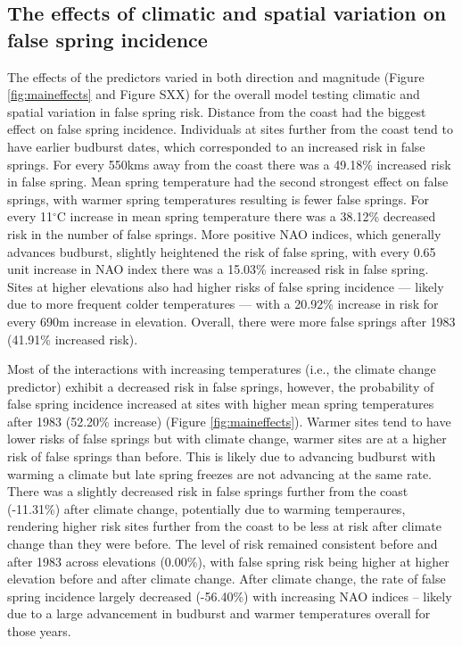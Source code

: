\documentclass{article}\usepackage[]{graphicx}\usepackage[]{color}
\begin{document}
\subsection*{The effects of climatic and spatial variation on false spring incidence}
The effects of the predictors varied in both direction and magnitude (Figure \ref{fig:maineffects} and Figure SXX) for the overall model testing climatic and spatial variation in false spring risk. Distance from the coast had the biggest effect on false spring incidence. Individuals at sites further from the coast tend to have earlier budburst dates, which corresponded to an increased risk in false springs. For every 550kms away from the coast there was a 49.18\% increased risk in false spring. Mean spring temperature had the second strongest effect on false springs, with warmer spring temperatures resulting is fewer false springs. For every 11$^{\circ}$C increase in mean spring temperature there was a 38.12\% decreased risk in the number of false springs. More positive NAO indices, which generally advances budburst, slightly heightened the risk of false spring, with every 0.65 unit increase in NAO index there was a 15.03\% increased risk in false spring. Sites at higher elevations also had higher risks of false spring incidence --- likely due to more frequent colder temperatures --- with a 20.92\% increase in risk for every 690m increase in elevation. Overall, there were more false springs after 1983 (41.91\% increased risk). 

Most of the interactions with increasing temperatures (i.e., the climate change predictor) exhibit a decreased risk in false springs, however, the probability of false spring incidence increased at sites with higher mean spring temperatures after 1983 (52.20\% increase) (Figure \ref{fig:maineffects}). Warmer sites tend to have lower risks of false springs but with climate change, warmer sites are at a higher risk of false springs than before. This is likely due to advancing budburst with warming a climate but late spring freezes are not advancing at the same rate. There was a slightly decreased risk in false springs further from the coast (-11.31\%) after climate change, potentially due to warming temperaures, rendering higher risk sites further from the coast to be less at risk after climate change than they were before. The level of risk remained consistent before and after 1983 across elevations (0.00\%), with false spring risk being higher at higher elevation before and after climate change. After climate change, the rate of false spring incidence largely decreased (-56.40\%) with increasing NAO indices -- likely due to a large advancement in budburst and warmer temperatures overall for those years. 
\end{document}
